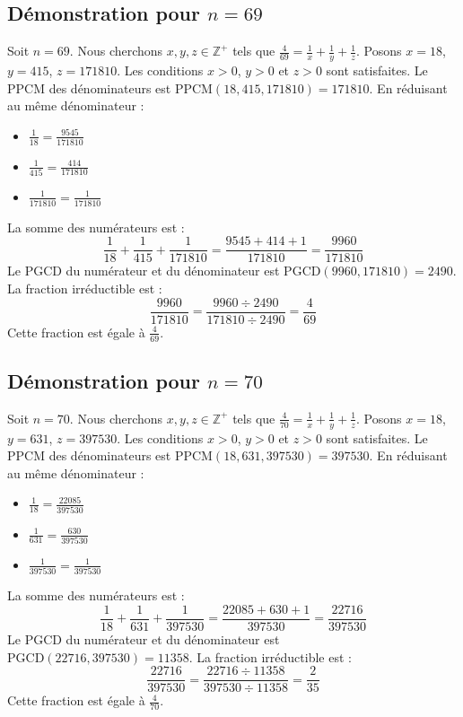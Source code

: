 \documentclass[11pt,a4paper]{article}
\begin{document}
\subsection{Démonstration pour $n = 69$}
Soit $n = 69$. Nous cherchons $x, y, z \in \mathbb{Z}^{+}$ tels que $\frac{4}{69} = \frac{1}{x} + \frac{1}{y} + \frac{1}{z}$.
Posons $x = 18$, $y = 415$, $z = 171810$.
Les conditions $x > 0$, $y > 0$ et $z > 0$ sont satisfaites.
Le PPCM des dénominateurs est $\text{PPCM}(18, 415, 171810) = 171810$.
En réduisant au même dénominateur :
\begin{itemize}
    \item $\frac{1}{18} = \frac{9545}{171810}$
    \item $\frac{1}{415} = \frac{414}{171810}$
    \item $\frac{1}{171810} = \frac{1}{171810}$
\end{itemize}
La somme des numérateurs est :
$$ \frac{1}{18} + \frac{1}{415} + \frac{1}{171810} = \frac{9545 + 414 + 1}{171810} = \frac{9960}{171810} $$
Le PGCD du numérateur et du dénominateur est $\text{PGCD}(9960, 171810) = 2490$.
La fraction irréductible est :
$$ \frac{9960}{171810} = \frac{9960 \div 2490}{171810 \div 2490} = \frac{4}{69} $$
Cette fraction est égale à $\frac{4}{69}$.

\subsection{Démonstration pour $n = 70$}
Soit $n = 70$. Nous cherchons $x, y, z \in \mathbb{Z}^{+}$ tels que $\frac{4}{70} = \frac{1}{x} + \frac{1}{y} + \frac{1}{z}$.
Posons $x = 18$, $y = 631$, $z = 397530$.
Les conditions $x > 0$, $y > 0$ et $z > 0$ sont satisfaites.
Le PPCM des dénominateurs est $\text{PPCM}(18, 631, 397530) = 397530$.
En réduisant au même dénominateur :
\begin{itemize}
    \item $\frac{1}{18} = \frac{22085}{397530}$
    \item $\frac{1}{631} = \frac{630}{397530}$
    \item $\frac{1}{397530} = \frac{1}{397530}$
\end{itemize}
La somme des numérateurs est :
$$ \frac{1}{18} + \frac{1}{631} + \frac{1}{397530} = \frac{22085 + 630 + 1}{397530} = \frac{22716}{397530} $$
Le PGCD du numérateur et du dénominateur est $\text{PGCD}(22716, 397530) = 11358$.
La fraction irréductible est :
$$ \frac{22716}{397530} = \frac{22716 \div 11358}{397530 \div 11358} = \frac{2}{35} $$
Cette fraction est égale à $\frac{4}{70}$.
\end{document}
